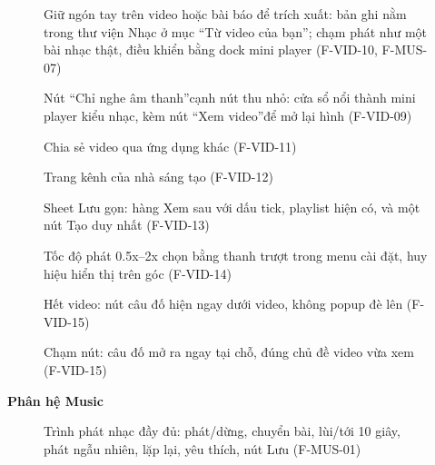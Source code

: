 \begin{figure}[H]
\centering
{}
\caption{\small Giữ ngón tay trên video hoặc bài báo để trích xuất: bản ghi nằm trong thư viện Nhạc ở mục ``Từ video của bạn''; chạm phát như một bài nhạc thật, điều khiển bằng dock mini player (F-VID-10, F-MUS-07)}
\end{figure}
\begin{figure}[H]
\centering
{}
\caption{\small Nút ``Chỉ nghe âm thanh''cạnh nút thu nhỏ: cửa sổ nổi thành mini player kiểu nhạc, kèm nút ``Xem video''để mở lại hình (F-VID-09)}
\end{figure}
\begin{figure}[H]
\centering
{}
\caption{\small Chia sẻ video qua ứng dụng khác (F-VID-11)}
\end{figure}
\begin{figure}[H]
\centering
{}
\caption{\small Trang kênh của nhà sáng tạo (F-VID-12)}
\end{figure}
\begin{figure}[H]
\centering
{}
\caption{\small Sheet Lưu gọn: hàng Xem sau với dấu tick, playlist hiện có, và một nút Tạo duy nhất (F-VID-13)}
\end{figure}
\begin{figure}[H]
\centering
{}
\caption{\small Tốc độ phát 0.5x--2x chọn bằng thanh trượt trong menu cài đặt, huy hiệu hiển thị trên góc (F-VID-14)}
\end{figure}
\begin{figure}[H]
\centering
{}
\caption{\small Hết video: nút câu đố hiện ngay dưới video, không popup đè lên (F-VID-15)}
\end{figure}
\begin{figure}[H]
\centering
{}
\caption{\small Chạm nút: câu đố mở ra ngay tại chỗ, đúng chủ đề video vừa xem (F-VID-15)}
\end{figure}
\textbf{Phân hệ Music}\\[6pt]
\begin{figure}[H]
\centering
{}
\caption{\small Trình phát nhạc đầy đủ: phát/dừng, chuyển bài, lùi/tới 10 giây, phát ngẫu nhiên, lặp lại, yêu thích, nút Lưu (F-MUS-01)}
\end{figure}
